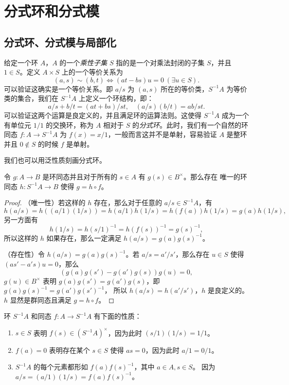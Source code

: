 \chapter{分式环和分式模}

\section{分式环、分式模与局部化}

给定一个环 $A$，$A$ 的一个\emph{乘性子集} $S$ 指的是一个对乘法封闭的子集 $S$，并且
$1\in S$。定义 $A\times S$ 上的一个等价关系为
\[
  (a,s)\sim (b,t)  \Longleftrightarrow
  (at-bs)u=0\ (\exists u\in S).
\]
可以验证这确实是一个等价关系。即 $a/s$ 为 $(a,s)$ 所在的等价类，$S^{-1}A$
为等价类的集合，我们在 $S^{-1}A$ 上定义一个环结构，即：
\[
  a/s+b/t=(at+bs)/st,\quad (a/s)(b/t)=ab/st.  
\]
可以验证这两个运算是良定义的，并且满足环的运算法则。这使得
$S^{-1}A$ 成为一个有单位元 $1/1$ 的交换环，称为 $A$ 相对于 $S$
的\emph{分式环}。此时，我们有一个自然的环同态 $f:A\to S^{-1}A$ 为
$f(x)=x/1$，一般而言这并不是单射，容易验证 $A$ 是整环并且 $0\notin S$ 的时候 $f$ 是单射。

我们也可以用泛性质刻画分式环。

\begin{proposition}\label{prop:universal property of fraction ring}
  令 $g:A\to B$ 是环同态并且对于所有的 $s\in A$ 有 $g(s)\in B^\times$。那么存在
  唯一的环同态 $h:S^{-1}A\to B$ 使得 $g=h\circ f$。
\end{proposition}
\begin{proof}
  （唯一性）若这样的 $h$ 存在，那么对于任意的 $a/s\in S^{-1}A$，有
  \[
    h(a/s)=h((a/1)(1/s))=h(a/1)h(1/s)=h(f(a))h(1/s)=g(a)h(1/s),  
  \]
  另一方面有
  \[
    h(1/s)=h(s/1)^{-1}=h(f(s))^{-1}=g(s)^{-1},  
  \]
  所以这样的 $h$ 如果存在，那么一定满足 $h(a/s)=g(a)g(s)^{-1}$。

  （存在性）令 $h(a/s)=g(a)g(s)^{-1}$。若 $a/s=a'/s'$，那么存在 $u\in S$
  使得 $(as'-a's)u=0$，那么
  \[
    (g(a)g(s')-g(a')g(s))g(u)=0,  
  \]
  $g(u)\in B^\times $ 表明 $g(a)g(s')=g(a')g(s)$，即 $g(a)g(s)^{-1}=g(a')g(s')^{-1}$，
  所以 $h(a/s)=h(a'/s')$，$h$ 是良定义的。$h$ 显然是群同态且满足 $g=h\circ f$。
\end{proof}

环 $S^{-1}A$ 和同态 $f:A\to S^{-1}A$ 有下面的性质：
\begin{enumerate}
  \item $s\in S$ 表明 $f(s)\in (S^{-1}A)^\times$，因为此时
  $(s/1)(1/s)=1/1$。
  \item $f(a)=0$ 表明存在某个 $s\in S$ 使得 $as=0$，因为此时 $a/1=0/1$。
  \item $S^{-1}A$ 的每个元素都形如 $f(a)f(s)^{-1}$，其中 $a\in A,s\in S$。
  因为 $a/s=(a/1)(1/s)=f(a)f(s)^{-1}$。
\end{enumerate}


